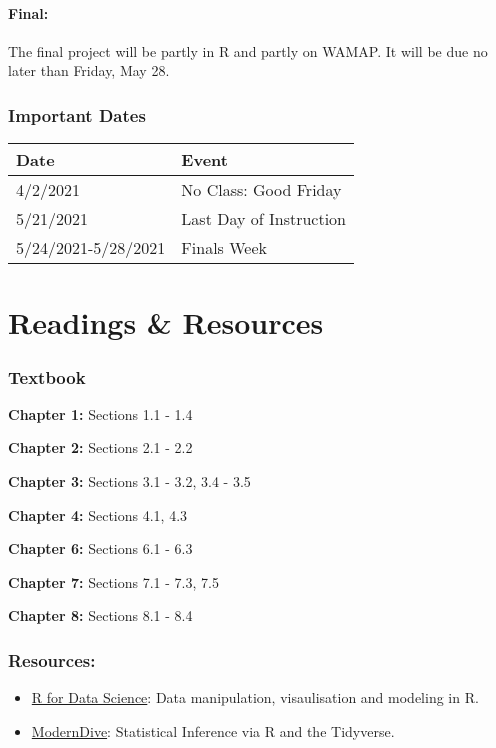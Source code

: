 \documentclass[
]{book}
\providecommand{\tightlist}{%
  \setlength{\itemsep}{0pt}\setlength{\parskip}{0pt}}
\begin{document}
\hypertarget{final}{%
\subsubsection{Final:}\label{final}}

The final project will be partly in R and partly on WAMAP. It will be due no later than Friday, May 28.

\hypertarget{important-dates}{%
\subsection{Important Dates}\label{important-dates}}

\begin{longtable}[]{@{}ll@{}}
\toprule
Date & Event\tabularnewline
\midrule
\endhead
4/2/2021 & No Class: Good Friday\tabularnewline
5/21/2021 & Last Day of Instruction\tabularnewline
5/24/2021-5/28/2021 & Finals Week\tabularnewline
\bottomrule
\end{longtable}

\hypertarget{rr}{%
\chapter{Readings \& Resources}\label{rr}}

\hypertarget{textbook}{%
\subsection{Textbook}\label{textbook}}

\textbf{Chapter 1:} Sections 1.1 - 1.4

\textbf{Chapter 2:} Sections 2.1 - 2.2

\textbf{Chapter 3:} Sections 3.1 - 3.2, 3.4 - 3.5

\textbf{Chapter 4:} Sections 4.1, 4.3

\textbf{Chapter 6:} Sections 6.1 - 6.3

\textbf{Chapter 7:} Sections 7.1 - 7.3, 7.5

\textbf{Chapter 8:} Sections 8.1 - 8.4

\hypertarget{resources}{%
\subsection{Resources:}\label{resources}}

\begin{itemize}
\tightlist
\item
  \href{https://r4ds.had.co.nz/}{R for Data Science}: Data manipulation, visaulisation and modeling in R.
\item
  \href{https://moderndive.com/}{ModernDive}: Statistical Inference via R and the Tidyverse.
\end{itemize}
\end{document}

